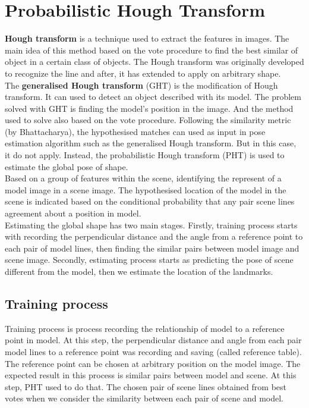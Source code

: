 \section{Probabilistic Hough Transform}
\textbf{Hough transform} is a technique used to extract the features in images. The main idea of this method based on the vote procedure to find the best similar of object in a certain class of objects. The Hough transform was originally developed to recognize the line\cite{hough1962method} and after, it has extended to apply on arbitrary shape\cite{duda1972use}.\\[0.2cm]
The \textbf{generalised Hough transform}\cite{ballard1981generalizing} (GHT) is the modification of Hough transform. It can used to detect an object described with its model. The problem solved with GHT is finding the model's position in the image. And the method used to solve also based on the vote procedure. Following the similarity metric (by Bhattacharya), the hypothesised matches can used as input in pose estimation algorithm such as the generalised Hough transform. But in this case, it do not apply. Instead, the probabilistic Hough transform (PHT) is used to estimate the global pose of shape\cite{ashbrook1995robust}.\\[0.3cm]
Based on a group of features within the scene, identifying the represent of a model image in a scene image. The hypothesised location of the model in the scene is indicated based on the conditional probability that any pair scene lines agreement about a position in model.\\[0.3cm]
Estimating the global shape has two main stages. Firstly, training process starts with recording the perpendicular distance and the angle from a reference point to each pair of model lines, then finding the similar pairs between model image and scene image. Secondly, estimating process starts as predicting the pose of scene different from the model, then we estimate the location of the landmarks.
\subsection{Training process}
Training process is process recording the relationship of model to a reference point in model. At this step, the perpendicular distance and angle from each pair model lines to a reference point was recording and saving (called reference table). The reference point can be chosen at arbitrary position on the model image. The expected result in this process is similar pairs between model and scene. At this step, PHT used to do that. The chosen pair of scene lines obtained from best votes when we consider the similarity between each pair of scene and model.
